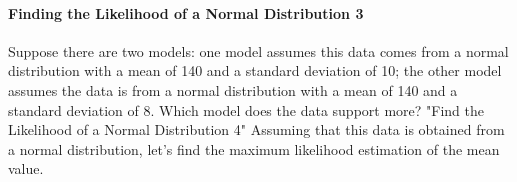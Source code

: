 \documentclass{ltjsbook}
\begin{document}
\paragraph{Finding the Likelihood of a Normal Distribution 3} Suppose there are two models: one model assumes this data comes from a normal distribution with a mean of 140 and a standard deviation of 10; the other model assumes the data is from a normal distribution with a mean of 140 and a standard deviation of 8. Which model does the data support more?
"Find the Likelihood of a Normal Distribution 4" Assuming that this data is obtained from a normal distribution, let's find the maximum likelihood estimation of the mean value.
\end{document}
